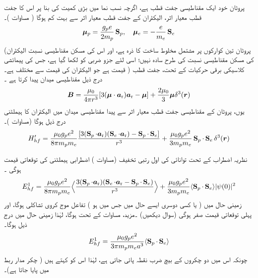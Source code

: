 پروٹان خود ایک مقناطیسی جفت قطب  ہے،  اگرچہ نسب نما میں بڑی  کمیت کی بنا پر اس کا جفت قطب معیار اثر،  الیکٹران کے جفت قطب معیار اثر سے بہت کم ہوگا ( مساوات )۔ 
\begin{align}
{\ensuremath{{\boldsymbol{\mu}}}}_p = \frac{g_p e}{2 m_p} \operatorname{\mathbf{S}}_p, \quad {\ensuremath{{\boldsymbol{\mu}}}}_e = - \frac{e}{m_e} \operatorname{\mathbf{S}}_e
\end{align}
(پروٹان  تین کوارکوں پر مشتمل  مخلوط ساخت کا ذرہ ہے،       اور اس کی مسکن مقناطیسی نسبت الیکٹران کی مسکن مقناطیسی نسبت کی طرح سادہ نہیں؛ اسی لئے      جزو ضربی کو   لکھا گیا ہے،  جس کی پیمائشی قیمت   ہے جو الیکٹران کی قیمت  سے مختلف ہے۔ ) کلاسیکی برقی حرکیات کے تحت، جفت قطب   درج ذیل مقناطیسی میدان پیدا کرتا ہے ۔
\begin{align}\label{مساوات_غیر_مضطرب_پروٹان_میدان}
{\ensuremath{{\boldsymbol{B}}}} = \frac{\mu_0}{4 \pi r^3} [3 ({{\boldsymbol{\mu}}} \cdot {\ensuremath{{\boldsymbol{a}}}_{\textup{r}}}) {{\boldsymbol{a}}_{\textup{r}}} - {{\boldsymbol{\mu}}}] + \frac{2 \mu_0}{3} {{\boldsymbol{\mu}}} \delta^3 ({{\boldsymbol{r}}})
\end{align}
یوں،   پروٹان کے مقناطیسی جفت قطب معیار اثر سے پیدا مقناطیسی میدان میں الیکٹران کا ہیملٹنی درج ذیل ہوگا  (مساوات )۔ 
\begin{align}
H'_{hf} = \frac{\mu_0 g_p e^2}{8 \pi m_p m_e} \frac{[3(\operatorname{\mathbf{S}}_p \cdot {\ensuremath{{\boldsymbol{a}}}_{\textup{r}}})(\operatorname{\mathbf{S}}_e \cdot {\ensuremath{{\boldsymbol{a}}}_{\textup{r}}}) - \operatorname{\mathbf{S}}_p \cdot \operatorname{\mathbf{S}}_e]}{r^3} + \frac{\mu_0 g_p e^2}{3m_p m_e} \operatorname{\mathbf{S}}_p \cdot \operatorname{\mathbf{S}}_e \delta^3 ({{\boldsymbol{r}}})
\end{align}

نظریہ اضطراب کے تحت توانائی کی اول رتبی تخفیف  (مساوات  )      اضطرابی ہیملٹنی  کی توقعاتی قیمت ہوگی ۔
\begin{align}
E_{hf}^1 = \frac{\mu_0 g_p e^2}{8 \pi m_p m_e} \Big\langle \frac{3(\operatorname{\mathbf{S}}_p \cdot {\ensuremath{{\boldsymbol{a}}}_{\textup{r}}})(\operatorname{\mathbf{S}}_e \cdot {\ensuremath{{\boldsymbol{a}}}_{\textup{r}}} - \operatorname{\mathbf{S}}_p \cdot \operatorname{\mathbf{S}}_e)}{r^3} \Big\rangle + \frac{\mu _0 g_p e^2}{3 m_p m_e} \langle \operatorname{\mathbf{S}}_p \cdot \operatorname{\mathbf{S}}_e \rangle |\psi (0)|^2
\end{align}
زمینی حال میں ( یا کسی دوسری ایسے حال میں جس میں  ہو ) تفاعل موج کروی تشاکلی ہوگا،  اور  پہلی  توقعاتی قیمت صفر ہوگی (سوال   دیکھیں) ۔مزید،  مساوات  کے تحت  ہوگا،  لہٰذا زمینی حال میں درج ذیل ہوگا۔ 
\begin{align}
E_{hf}^1 = \frac{\mu_0 g_p e^2}{3 \pi m_p m_e a^3} \langle \operatorname{\mathbf{S}}_p \cdot \operatorname{\mathbf{S}}_e \rangle
\end{align}
چونکہ اس میں دو چکروں کے بیچ ضرب نقطہ پائی جاتی  ہے،  لہٰذا اس کو   کہتے ہیں ( چکر مدار ربط میں  پایا جاتا ہے)۔

